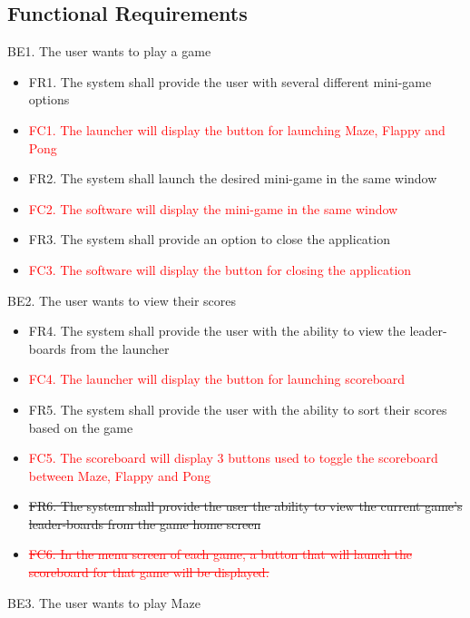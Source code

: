 \documentclass[12pt, titlepage]{article}
\begin{document}
\subsection{Functional Requirements}
    BE1. The user wants to play a game
    \begin{itemize}
    \item FR1. The system shall provide the user with several different mini-game options
    \item \textcolor{red}{FC1. The launcher will display the button for launching Maze, Flappy and Pong}
    \item FR2. The system shall launch the desired mini-game in the same window
    \item \textcolor{red}{FC2. The software will display the mini-game in the same window}
    \item FR3. The system shall provide an option to close the application
    \item \textcolor{red}{FC3. The software will display the button for closing the application}
    \end{itemize}
    BE2. The user wants to view their scores
    \begin{itemize}
        \item FR4. The system shall provide the user with the ability to view the leader-boards from the launcher
        \item \textcolor{red}{FC4. The launcher will display the button for launching scoreboard}
        \item FR5. The system shall provide the user with the ability to sort their scores based on the game
        \item \textcolor{red}{FC5. The scoreboard will display 3 buttons used to toggle the scoreboard between Maze, Flappy and Pong}
        \item \sout{FR6. The system shall provide the user the ability to view the current game’s leader-boards from the game home screen}
        \item \textcolor{red}{\sout{FC6. In the menu screen of each game, a button that will launch the scoreboard for that game will be displayed.}}
    \end{itemize}
    BE3. The user wants to play Maze
\end{document}
